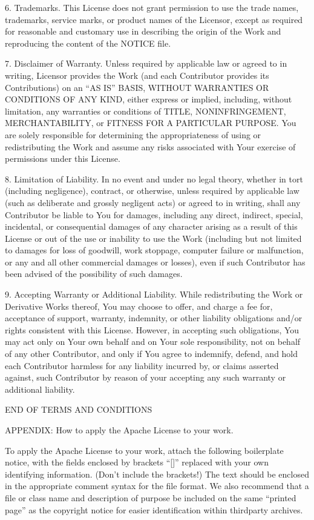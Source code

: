 \documentclass[letterpaper,10pt,english]{sphinxmanual}
\begin{document}
6. Trademarks. This License does not grant permission to use the trade
names, trademarks, service marks, or product names of the Licensor,
except as required for reasonable and customary use in describing the
origin of the Work and reproducing the content of the NOTICE file.

7. Disclaimer of Warranty. Unless required by applicable law or
agreed to in writing, Licensor provides the Work (and each
Contributor provides its Contributions) on an “AS IS” BASIS,
WITHOUT WARRANTIES OR CONDITIONS OF ANY KIND, either express or
implied, including, without limitation, any warranties or conditions
of TITLE, NON\sphinxhyphen{}INFRINGEMENT, MERCHANTABILITY, or FITNESS FOR A
PARTICULAR PURPOSE. You are solely responsible for determining the
appropriateness of using or redistributing the Work and assume any
risks associated with Your exercise of permissions under this License.

8. Limitation of Liability. In no event and under no legal theory,
whether in tort (including negligence), contract, or otherwise,
unless required by applicable law (such as deliberate and grossly
negligent acts) or agreed to in writing, shall any Contributor be
liable to You for damages, including any direct, indirect, special,
incidental, or consequential damages of any character arising as a
result of this License or out of the use or inability to use the
Work (including but not limited to damages for loss of goodwill,
work stoppage, computer failure or malfunction, or any and all
other commercial damages or losses), even if such Contributor
has been advised of the possibility of such damages.

9. Accepting Warranty or Additional Liability. While redistributing
the Work or Derivative Works thereof, You may choose to offer,
and charge a fee for, acceptance of support, warranty, indemnity,
or other liability obligations and/or rights consistent with this
License. However, in accepting such obligations, You may act only
on Your own behalf and on Your sole responsibility, not on behalf
of any other Contributor, and only if You agree to indemnify,
defend, and hold each Contributor harmless for any liability
incurred by, or claims asserted against, such Contributor by reason
of your accepting any such warranty or additional liability.

END OF TERMS AND CONDITIONS

APPENDIX: How to apply the Apache License to your work.

To apply the Apache License to your work, attach the following
boilerplate notice, with the fields enclosed by brackets “{[}{]}”
replaced with your own identifying information. (Don’t include
the brackets!)  The text should be enclosed in the appropriate
comment syntax for the file format. We also recommend that a
file or class name and description of purpose be included on the
same “printed page” as the copyright notice for easier
identification within third\sphinxhyphen{}party archives.
\end{document}
